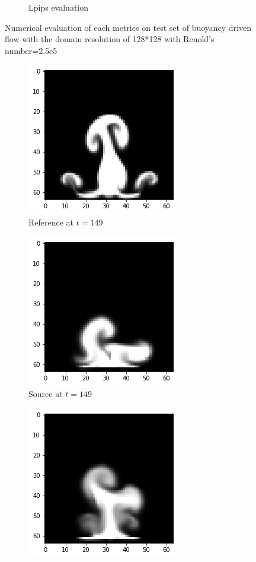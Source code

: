 \documentclass[a4paper,12pt,twoside]{report}
\begin{document}
\begin{figure}
\begin{subfigure}{0.32\textwidth}
		\caption{Lpips evaluation}
	\end{subfigure}
	\caption{Numerical evaluation of each metrics on test set of buoyancy driven flow with the domain resolution of 128*128 with Renold's number=2.5e5}
	\label{sol buoyancy high numeval}
		\end{figure}
	
	
	
	\begin{figure}
		\centering
		\begin{subfigure}{0.32\textwidth}
			\centering
			\includegraphics[scale=0.5]{buoyancy_low/ref}
			\caption{Reference at $t=149$}
		\end{subfigure}
		\begin{subfigure}{0.32\textwidth}
			\centering
			\includegraphics[scale=0.5]{buoyancy_low/source}
			\caption{Source at $t=149$}
		\end{subfigure}
		\begin{subfigure}{0.32\textwidth}
			\centering
			\includegraphics[scale=0.5]{buoyancy_low/mse}

\end{subfigure}
\end{figure}
\end{document}
